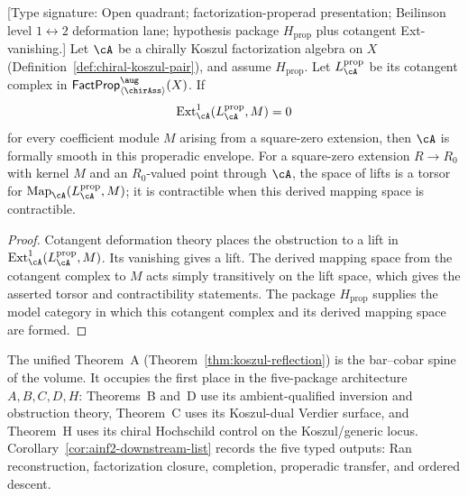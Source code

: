 \begin{corollary}
\label{cor:chiral-KK-formal-smoothness}
\textup{[Type signature: Open quadrant; factorization-properad
presentation; Beilinson level $1\leftrightarrow2$ deformation lane;
hypothesis package $H_{\mathrm{prop}}$ plus cotangent Ext-vanishing.]}
Let $\cA$ be a chirally Koszul factorization algebra on $X$
\textup{(}Definition~\textup{\ref{def:chiral-koszul-pair}}), and assume
$H_{\mathrm{prop}}$.  Let $L_{\cA}^{\mathrm{prop}}$ be its cotangent
complex in
$\FactProp^{\aug}_{\langle\chirAss\rangle}(X)$.  If
\[
 \operatorname{Ext}^1_{\cA}(L_{\cA}^{\mathrm{prop}},M)=0
\]
for every coefficient module $M$ arising from a square-zero
extension, then $\cA$ is formally smooth in this properadic envelope.
For a square-zero extension $R\to R_0$ with kernel $M$ and an
$R_0$-valued point through $\cA$, the space of lifts is a torsor for
$\operatorname{Map}_{\cA}(L_{\cA}^{\mathrm{prop}},M)$; it is
contractible when this derived mapping space is contractible.
\end{corollary}

\begin{proof}
Cotangent deformation theory places the obstruction to a lift in
$\operatorname{Ext}^1_{\cA}(L_{\cA}^{\mathrm{prop}},M)$.  Its
vanishing gives a lift.  The derived mapping space from the cotangent
complex to $M$ acts simply transitively on the lift space, which gives
the asserted torsor and contractibility statements.  The package
$H_{\mathrm{prop}}$ supplies the model category in which this
cotangent complex and its derived mapping space are formed.
\end{proof}

\begin{remark}
\label{rem:ainf2-architecture}
The unified Theorem~A
(Theorem~\ref{thm:koszul-reflection}) is the bar--cobar spine of the
volume. It occupies the first place in the five-package architecture
$A,B,C,D,H$: Theorems~B and~D use its ambient-qualified inversion and
obstruction theory, Theorem~C uses its Koszul-dual Verdier surface,
and Theorem~H uses its chiral Hochschild control on the Koszul/generic
locus.  Corollary~\ref{cor:ainf2-downstream-list} records the five
typed outputs: Ran reconstruction, factorization closure, completion,
properadic transfer, and ordered descent.
\end{remark}

